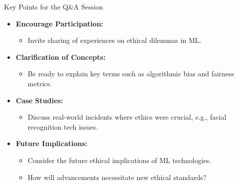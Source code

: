 \documentclass[aspectratio=169]{beamer}
\begin{document}
\begin{frame}[fragile]{Key Points for the Q\&A Session}
    \begin{itemize}
        \item \textbf{Encourage Participation:}
            \begin{itemize}
                \item Invite sharing of experiences on ethical dilemmas in ML.
            \end{itemize}
        \item \textbf{Clarification of Concepts:}
            \begin{itemize}
                \item Be ready to explain key terms such as algorithmic bias and fairness metrics.
            \end{itemize}
        \item \textbf{Case Studies:}
            \begin{itemize}
                \item Discuss real-world incidents where ethics were crucial, e.g., facial recognition tech issues.
            \end{itemize}
        \item \textbf{Future Implications:}
            \begin{itemize}
                \item Consider the future ethical implications of ML technologies.
                \item How will advancements necessitate new ethical standards?
            \end{itemize}
    \end{itemize}
\end{frame}
\end{document}
